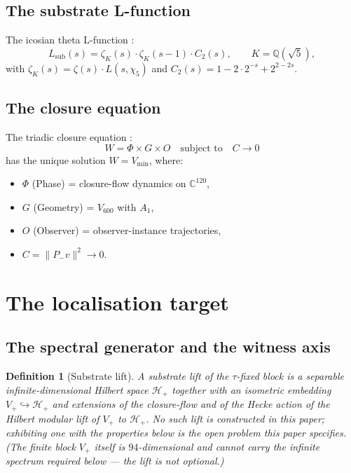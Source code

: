 \documentclass[11pt,a4paper]{article}
\newtheorem{definition}[theorem]{Definition}
\newcommand{\Vsix}{V_{600}}
\newcommand{\Q}{\mathbb{Q}}
\newcommand{\C}{\mathbb{C}}
\newcommand{\Vmin}{V_{\min}}
\newcommand{\Lsub}{L_{\mathrm{sub}}}
\newcommand{\Wit}{W}
\begin{document}
\subsection{The substrate L-function}

The icosian theta L-function \cite{icosianTriad}:
\[
\Lsub(s) = \zeta_K(s) \cdot \zeta_K(s-1) \cdot C_2(s),
\qquad K = \Q(\sqrt 5),
\]
with $\zeta_K(s) = \zeta(s) \cdot L(s, \chi_5)$ and $C_2(s) = 1 -
2 \cdot 2^{-s} + 2^{2-2s}$.

\subsection{The closure equation}

The triadic closure equation \cite{observerAttractor}:
\[
\Wit = \Phi \times G \times O \quad \text{subject to} \quad C \to 0
\]
has the unique solution $\Wit = \Vmin$, where:
\begin{itemize}[leftmargin=*]
  \item $\Phi$ (Phase) = closure-flow dynamics on $\C^{120}$,
  \item $G$ (Geometry) = $\Vsix$ with $A_1$,
  \item $O$ (Observer) = observer-instance trajectories,
  \item $C = \|P_- v\|^2 \to 0$.
\end{itemize}

\section{The localisation target}
\label{sec:main}

\subsection{The spectral generator and the witness axis}

\begin{definition}[Substrate lift]
\label{def:lift}
A \emph{substrate lift} of the $\tau$-fixed block is a separable
infinite-dimensional Hilbert space $\mathcal{H}_+$ together with
an isometric embedding $V_+ \hookrightarrow \mathcal{H}_+$ and
extensions of the closure-flow and of the Hecke action of the
Hilbert modular lift of $V_+$ to $\mathcal{H}_+$. No such lift is
constructed in this paper; exhibiting one with the properties
below is the open problem this paper specifies. (The finite block
$V_+$ itself is $94$-dimensional and cannot carry the infinite
spectrum required below --- the lift is not optional.)
\end{definition}
\end{document}
